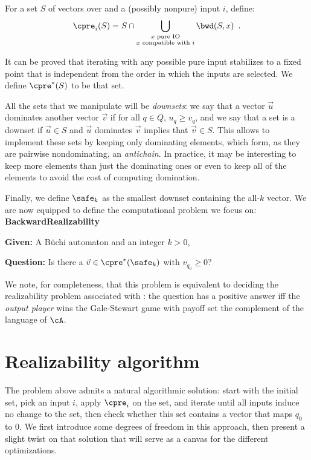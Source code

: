 \documentclass[sigconf,screen,nonacm]{acmart}
\begin{document}
For a set \(S\) of vectors over \cA and a (possibly nonpure) input \(i\), define:
\[\cpre_i(S) = S \cap \bigcup_{\substack{x \text{ pure IO}\\x \text{ compatible with } i}} \bwd(S, x)\enspace.\]

It can be proved that iterating \cpre with any possible pure input stabilizes to
a fixed point that is independent from the order in which the inputs are
selected.  We define \(\cpre^*(S)\) to be that set.

All the sets that we manipulate will be \emph{downsets}: we say that a vector
\(\vec{u}\) dominates another vector \(\vec{v}\) if for all \(q \in Q\),
\(u_q \geq v_q\), and we say that a set is a downset if \(\vec{u} \in S\) and
\(\vec{u}\) dominates \(\vec{v}\) implies that \(\vec{v} \in S\).  This allows to
implement these sets by keeping only dominating elements, which form, as they
are pairwise nondominating, an \emph{antichain}.  In practice, it may be
interesting to keep more elements than just the dominating ones or even to keep
all of the elements to avoid the cost of computing domination.

Finally, we define \(\safe_k\) as the smallest downset containing the all-\(k\)
vector.
We are now equipped to define the computational problem we focus on:\\[1em]
\textbf{BackwardRealizability}
\begin{compactitem}
\item \textbf{Given:} A Büchi automaton \cA and an integer \(k > 0\),
\item \textbf{Question:} Is there a \(\vec{v} \in \cpre^*(\safe_k)\) with \(v_{q_0} \geq
  0\)?
\end{compactitem}
\vspace{1em}

We note, for completeness, that this problem is equivalent to deciding the
realizability problem associated with \cA: the question has a positive answer
iff the \emph{output player} wins the Gale-Stewart game with payoff set the
complement of the language of \(\cA\).

\section{Realizability algorithm}

The problem above admits a natural algorithmic solution: start with the initial
set, pick an input \(i\), apply \(\cpre_i\) on the set, and iterate until all inputs
induce no change to the set, then check whether this set contains a vector that
maps \(q_0\) to \(0\).  We first introduce some degrees of freedom in this approach,
then present a slight twist on that solution that will serve as a canvas for the
different optimizations.
\end{document}
